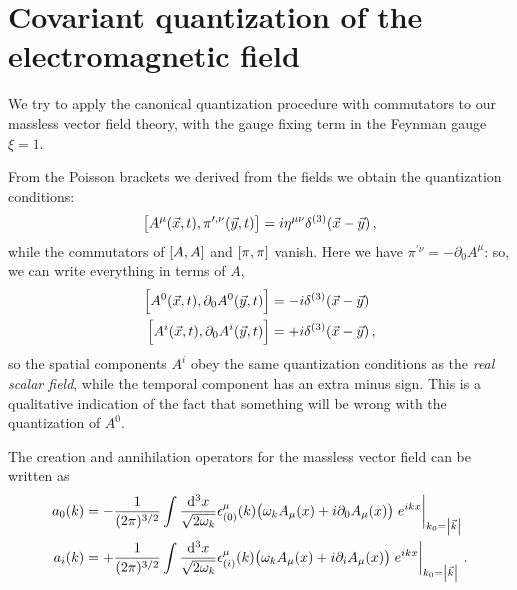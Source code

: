 \documentclass[main.tex]{subfiles}
\begin{document}
\section{Covariant quantization of the electromagnetic field}


We try to apply the canonical quantization procedure with commutators to our massless vector field theory, with the gauge fixing term in the Feynman gauge \(\xi = 1\). 

From the Poisson brackets we derived from the fields we obtain the quantization conditions: 
%
\begin{align}
\qty[A^{\mu }(\vec{x}, t), \pi^{\prime, \nu }(\vec{y}, t)] = i \eta^{\mu \nu } \delta^{(3)} (\vec{x}-\vec{y})
\,,
\end{align}
%
while the commutators of \(\qty[A, A]\) and \(\qty[\pi , \pi ]\) vanish. 
Here we have \(\pi^{\prime \nu } = - \partial_0 A^{\mu }\): so, we can write everything in terms of \(A\),
%
\begin{align}
\qty[A^{0} (\vec{x}, t), \partial_0 A^{0} (\vec{y}, t)] &= - i \delta^{(3)} (\vec{x} - \vec{y}) \\
\qty[A^{i} (\vec{x}, t), \partial_0 A^{i} (\vec{y}, t)] &= + i \delta^{(3)} (\vec{x} - \vec{y})
\,,
\end{align}
%
so the spatial components \(A^{i}\) obey the same quantization conditions as the \emph{real scalar field}, while the temporal component has an extra minus sign. 
This is a qualitative indication of the fact that something will be wrong with the quantization of \(A^{0}\). 

\begin{claim}
The creation and annihilation operators for the massless vector field can be written as 
%
\begin{align}
a_0 (k) &= - \frac{1}{(2 \pi )^{3/2}} \int \frac{ \dd[3]{x}}{\sqrt{2 \omega_{k}}}
\epsilon^{\mu }_{(0)} (k) \qty(\omega_{k} A_{\mu } (x) + i \partial_0 A_{\mu }(x))\eval{e^{ikx}}_{k_0 = \abs{\vec{k}}} \\
a_i (k) &= + \frac{1}{(2 \pi )^{3/2}} \int \frac{ \dd[3]{x}}{\sqrt{2 \omega_{k}}}
\epsilon^{\mu }_{(i)} (k) \qty(\omega_{k} A_{\mu } (x) + i \partial_i A_{\mu }(x))\eval{e^{ikx}}_{k_0 = \abs{\vec{k}}}
\,.
\end{align}
\end{claim}
\end{document}
